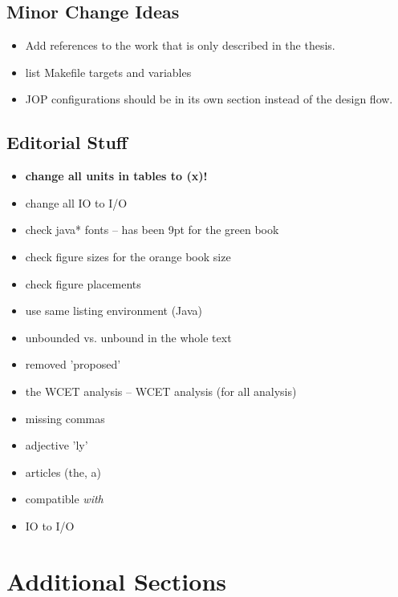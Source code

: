 \subsection{Minor Change Ideas}

\begin{itemize}
  \item Add references to the work that is only described in the
      thesis.
  \item list Makefile targets and variables
  \item JOP configurations should be in its own section instead
      of the design flow.
\end{itemize}

\subsection{Editorial Stuff}

\begin{itemize}
  \item \textbf{change all units in tables to (x)!}
  \item change all IO to I/O
  \item check java* fonts -- has been 9pt for the green book
  \item check figure sizes for the orange book size
  \item check figure placements
  \item use same listing environment (Java)
  \item unbounded vs. unbound in the whole text
  \item removed 'proposed'
  \item the WCET analysis -- WCET analysis (for all analysis)
  \item missing commas
  \item adjective 'ly'
  \item articles (the, a)
  \item compatible \emph{with}
  \item IO to I/O
\end{itemize}

\section{Additional Sections}

